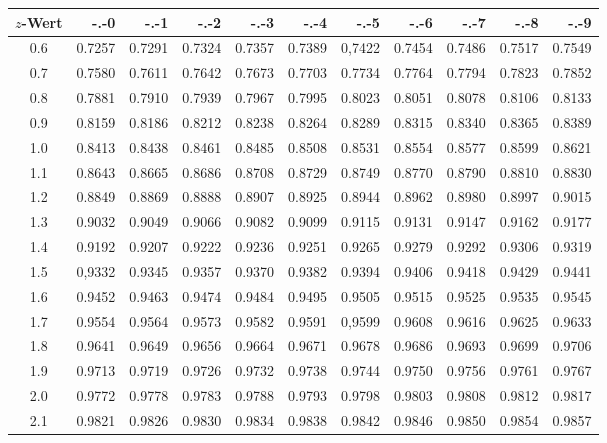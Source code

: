 \documentclass[11pt,a4paper]{article}
\begin{document}
\begin{table}[h]
	\centering
	\begin{tabular}{|c||r|r|r|r|r|r|r|r|r|r|}
		\hline
		$z$-Wert & -.-0 & -.-1 & -.-2 & -.-3 & -.-4 & -.-5 & -.-6 & -.-7 & -.-8 & -.-9 \\
		\hline
		\hline
		0.6	& 0.7257	& 0.7291	& 0.7324	& 0.7357	& 0.7389	& 0,7422	& 0.7454	& 0.7486	& 0.7517	& 0.7549\\		
		\hline
		0.7	& 0.7580	& 0.7611	& 0.7642	& 0.7673	& 0.7703	& 0.7734	& 0.7764	& 0.7794	& 0.7823	& 0.7852\\
		\hline
		0.8	& 0.7881	& 0.7910	& 0.7939	& 0.7967	& 0.7995	& 0.8023	& 0.8051	& 0.8078	& 0.8106	& 0.8133\\
		\hline
		0.9	& 0.8159	& 0.8186	& 0.8212	& 0.8238	& 0.8264	& 0.8289	& 0.8315	& 0.8340	& 0.8365	& 0.8389\\
		\hline
		1.0	& 0.8413	& 0.8438	& 0.8461	& 0.8485	& 0.8508	& 0.8531	& 0.8554	& 0.8577	& 0.8599	& 0.8621\\
		\hline
		1.1	& 0.8643	& 0.8665	& 0.8686	& 0.8708	& 0.8729	& 0.8749	& 0.8770	& 0.8790	& 0.8810	& 0.8830\\
		\hline
		1.2	& 0.8849	& 0.8869	& 0.8888	& 0.8907	& 0.8925	& 0.8944	& 0.8962	& 0.8980	& 0.8997	& 0.9015\\
		\hline
		1.3	& 0.9032	& 0.9049	& 0.9066	& 0.9082	& 0.9099	& 0.9115	& 0.9131	& 0.9147	& 0.9162	& 0.9177\\
		\hline
		1.4	& 0.9192	& 0.9207	& 0.9222	& 0.9236	& 0.9251	& 0.9265	& 0.9279	& 0.9292	& 0.9306	& 0.9319\\
		\hline
		1.5	& 0,9332	& 0.9345	& 0.9357	& 0.9370	& 0.9382	& 0.9394	& 0.9406	& 0.9418	& 0.9429	& 0.9441\\
		\hline
		1.6	& 0.9452	& 0.9463	& 0.9474	& 0.9484	& 0.9495	& 0.9505	& 0.9515	& 0.9525	& 0.9535	& 0.9545\\
		\hline
		1.7	& 0.9554	& 0.9564	& 0.9573	& 0.9582	& 0.9591	& 0,9599	& 0.9608	& 0.9616	& 0.9625	& 0.9633\\
		\hline
		1.8	& 0.9641	& 0.9649	& 0.9656	& 0.9664	& 0.9671	& 0.9678	& 0.9686	& 0.9693	& 0.9699	& 0.9706\\
		\hline
		1.9	& 0.9713	& 0.9719	& 0.9726	& 0.9732	& 0.9738	& 0.9744	& 0.9750	& 0.9756	& 0.9761	& 0.9767\\
		\hline
		2.0	& 0.9772	& 0.9778	& 0.9783	& 0.9788	& 0.9793	& 0.9798	& 0.9803	& 0.9808	& 0.9812	& 0.9817\\
		\hline
		2.1	& 0.9821	& 0.9826	& 0.9830	& 0.9834	& 0.9838	& 0.9842	& 0.9846	& 0.9850	& 0.9854	& 0.9857\\

\end{tabular}
\end{table}
\end{document}
